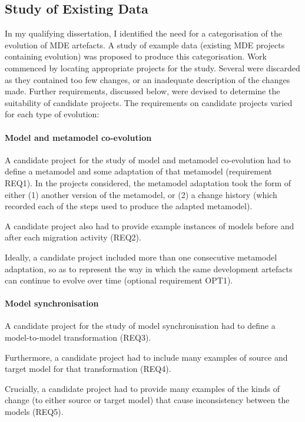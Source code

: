 \subsection{Study of Existing Data}
In my qualifying dissertation, I identified the need for a categorisation of the evolution of MDE artefacts. A study of example data (existing MDE projects containing evolution) was proposed to produce this categorisation. Work commenced by locating appropriate projects for the study. Several were discarded as they contained too few changes, or an inadequate description of the changes made. Further requirements, discussed below, were devised to determine the suitability of candidate projects. The requirements on candidate projects varied for each type of evolution:

\paragraph{Model and metamodel co-evolution}
A candidate project for the study of model and metamodel co-evolution had to define a metamodel and some adaptation of that metamodel (requirement REQ1). In the projects considered, the metamodel adaptation took the form of either (1) another version of the metamodel, or (2) a change history (which recorded each of the steps used to produce the adapted metamodel).

A candidate project also had to provide example instances of models before and after each migration activity (REQ2).

Ideally, a candidate project included more than one consecutive metamodel adaptation, so as to represent the way in which the same development artefacts can continue to evolve over time (optional requirement OPT1).

\paragraph{Model synchronisation}
A candidate project for the study of model synchronisation had to define a model-to-model transformation (REQ3).

Furthermore, a candidate project had to include many examples of source and target model for that transformation (REQ4).

Crucially, a candidate project had to provide many examples of the kinds of change (to either source or target model) that cause inconsistency between the models (REQ5). 

